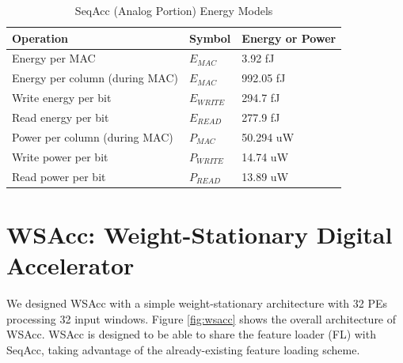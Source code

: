 \begin{table}[]
\centering
\caption{SeqAcc (Analog Portion) Energy Models}
\label{tab:seqAccEnergyModels}
\begin{tabular}{lll}
\hline
\textbf{Operation} & \textbf{Symbol} & \textbf{Energy or Power} \\
\hline
Energy per MAC & $E_{MAC}$       & 3.92 fJ                  \\
Energy per column (during MAC) & $E_{MAC}$       & 992.05 fJ                  \\
Write energy per bit& $E_{WRITE}$     & 294.7 fJ                 \\
Read energy per bit& $E_{READ}$      & 277.9 fJ                \\
Power per column (during MAC) & $P_{MAC}$       & 50.294 uW              \\
Write power per bit& $P_{WRITE}$     & 14.74 uW             \\ 
Read power per bit& $P_{READ}$      & 13.89 uW                \\
\end{tabular}%
\end{table}


\section{WSAcc: Weight-Stationary Digital Accelerator}

We designed WSAcc with a simple weight-stationary architecture with 32 PEs processing 32 input windows.
Figure \ref{fig:wsacc} shows the overall architecture of WSAcc. WSAcc is designed to be able to share the feature loader (FL) with SeqAcc, taking advantage of the already-existing feature loading scheme. 

